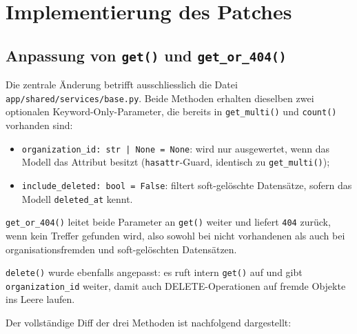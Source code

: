\section{Implementierung des Patches}
\label{sec:implementierung}

\subsection{Anpassung von \texttt{get()} und \texttt{get\_or\_404()}}
\label{sec:patch-base}

Die zentrale Änderung betrifft ausschliesslich die Datei
\texttt{app/shared/services/base.py}.
Beide Methoden erhalten dieselben zwei optionalen Keyword-Only-Parameter, die
bereits in \texttt{get\_multi()} und \texttt{count()} vorhanden sind:

\begin{itemize}
    \item \texttt{organization\_id: str | None = None}: wird nur ausgewertet, wenn
          das Modell das Attribut besitzt (\texttt{hasattr}-Guard, identisch zu
          \texttt{get\_multi()});
    \item \texttt{include\_deleted: bool = False}: filtert soft-gelöschte
          Datensätze, sofern das Modell \texttt{deleted\_at} kennt.
\end{itemize}

\texttt{get\_or\_404()} leitet beide Parameter an \texttt{get()} weiter und
liefert \texttt{404} zurück, wenn kein Treffer gefunden wird, also sowohl bei
nicht vorhandenen als auch bei organisationsfremden und soft-gelöschten
Datensätzen.

\texttt{delete()} wurde ebenfalls angepasst: es ruft intern \texttt{get()} auf
und gibt \texttt{organization\_id} weiter, damit auch DELETE-Operationen auf
fremde Objekte ins Leere laufen.

Der vollständige Diff der drei Methoden ist nachfolgend dargestellt:

